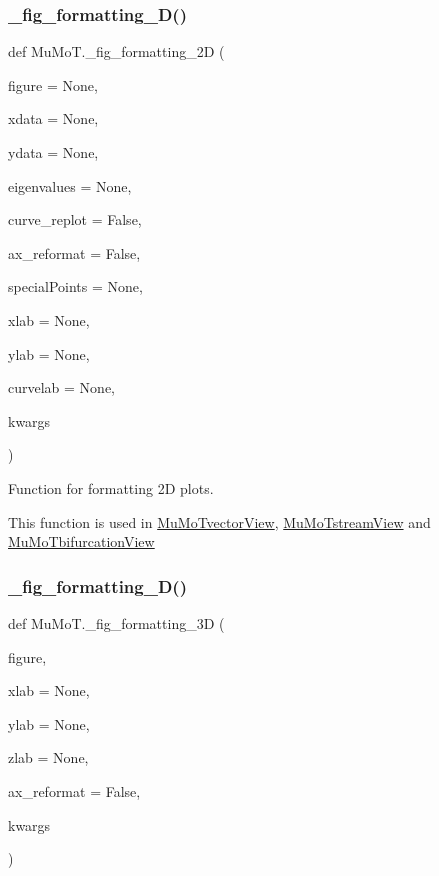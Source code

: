 \subsubsection{\texorpdfstring{\+\_\+fig\+\_\+formatting\+\_\+D()}{\_fig\_formatting\_2D()}}
{\footnotesize\ttfamily def Mu\+Mo\+T.\+\_\+fig\+\_\+formatting\+\_\+2D (\begin{DoxyParamCaption}\item[{}]{figure = {\ttfamily None},  }\item[{}]{xdata = {\ttfamily None},  }\item[{}]{ydata = {\ttfamily None},  }\item[{}]{eigenvalues = {\ttfamily None},  }\item[{}]{curve\+\_\+replot = {\ttfamily False},  }\item[{}]{ax\+\_\+reformat = {\ttfamily False},  }\item[{}]{special\+Points = {\ttfamily None},  }\item[{}]{xlab = {\ttfamily None},  }\item[{}]{ylab = {\ttfamily None},  }\item[{}]{curvelab = {\ttfamily None},  }\item[{}]{kwargs }\end{DoxyParamCaption})\hspace{0.3cm}{\ttfamily [private]}}



Function for formatting 2D plots. 

This function is used in \hyperlink{class_mu_mo_t_1_1_mu_mo_tvector_view}{Mu\+Mo\+Tvector\+View}, \hyperlink{class_mu_mo_t_1_1_mu_mo_tstream_view}{Mu\+Mo\+Tstream\+View} and \hyperlink{class_mu_mo_t_1_1_mu_mo_tbifurcation_view}{Mu\+Mo\+Tbifurcation\+View} \mbox{\label{namespace_mu_mo_t_a35eaa446589326bb98bc0978be4e368f}} 
\subsubsection{\texorpdfstring{\+\_\+fig\+\_\+formatting\+\_\+D()}{\_fig\_formatting\_3D()}}
{\footnotesize\ttfamily def Mu\+Mo\+T.\+\_\+fig\+\_\+formatting\+\_\+3D (\begin{DoxyParamCaption}\item[{}]{figure,  }\item[{}]{xlab = {\ttfamily None},  }\item[{}]{ylab = {\ttfamily None},  }\item[{}]{zlab = {\ttfamily None},  }\item[{}]{ax\+\_\+reformat = {\ttfamily False},  }\item[{}]{kwargs }\end{DoxyParamCaption})\hspace{0.3cm}{\ttfamily [private]}}



